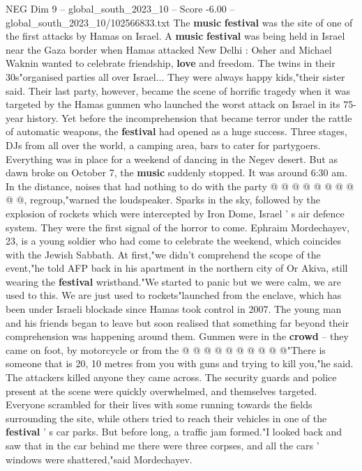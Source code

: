 \begin{textsample}{NEG Dim 9 – global\_south\_2023\_10 – Score -6.00 – global\_south\_2023\_10/102566833.txt}  \label{ex:f9_neg_366}
The \textbf{music} \textbf{festival} was the site of one of the first attacks by Hamas on Israel.
A \textbf{music} \textbf{festival} was being held in Israel near the Gaza border when Hamas attacked New Delhi : Osher and Michael Waknin wanted to celebrate friendship, \textbf{love} and freedom.
The twins in their 30s"organised parties all over Israel...
They were always happy kids,"their sister said.
Their last party, however, became the scene of horrific tragedy when it was targeted by the Hamas gunmen who launched the worst attack on Israel in its 75-year history.
Yet before the incomprehension that became terror under the rattle of automatic weapons, the \textbf{festival} had opened as a huge success.
Three stages, DJs from all over the world, a camping area, bars to cater for partygoers.
Everything was in place for a weekend of dancing in the Negev desert.
But as dawn broke on October 7, the \textbf{music} suddenly stopped.
It was around 6:30 am.
In the distance, noises that had nothing to do with the party @ @ @ @ @ @ @ @ @ @, regroup,"warned the loudspeaker.
Sparks in the sky, followed by the explosion of rockets which were intercepted by Iron Dome, Israel ' s air defence system.
They were the first signal of the horror to come.
Ephraim Mordechayev, 23, is a young soldier who had come to celebrate the weekend, which coincides with the Jewish Sabbath.
At first,"we didn't comprehend the scope of the event,"he told AFP back in his apartment in the northern city of Or Akiva, still wearing the \textbf{festival} wristband."We started to panic but we were calm, we are used to this.
We are just used to rockets"launched from the enclave, which has been under Israeli blockade since Hamas took control in 2007.
The young man and his friends began to leave but soon realised that something far beyond their comprehension was happening around them.
Gunmen were in the \textbf{crowd} -- they came on foot, by motorcycle or from the @ @ @ @ @ @ @ @ @ @"There is someone that is 20, 10 metres from you with guns and trying to kill you,"he said.
The attackers killed anyone they came across.
The security guards and police present at the scene were quickly overwhelmed, and themselves targeted.
Everyone scrambled for their lives with some running towards the fields surrounding the site, while others tried to reach their vehicles in one of the \textbf{festival} ' s car parks.
But before long, a traffic jam formed."I looked back and saw that in the car behind me there were three corpses, and all the cars ' windows were shattered,"said Mordechayev.

\end{textsample}
